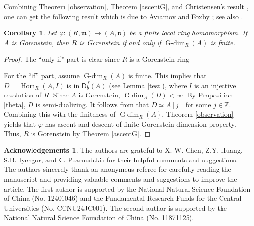 \documentclass{amsart}
\newcommand{\n}{\mathfrak{n}}
\newcommand{\D}{\mathsf{D}}
\newcommand{\0}{{\bf{0}}}
\newcommand{\m}{\mathfrak{m}}
\DeclareMathOperator{\Gdim}{G-dim}
\DeclareMathOperator{\Hom}{Hom}
\newtheorem{corollary}[theorem]{Corollary}
\theoremstyle{definition}
\newtheorem*{ack}{Acknowledgements}
\begin{document}
Combining Theorem \ref{observation}, Theorem \ref{ascentG}, and Christensen’s result \cite[Proposition 8.3]{Chr01}, one can get the following result which is due to Avramov and Foxby \cite[4.4.4 and 7.7.2]{AF}; see also \cite[Theorem 6.2]{ISW}.

\begin{corollary}\label{recover}
Let $\varphi\colon (R,\m)\rightarrow (A,\n)$ be a finite local ring homomorphism. If $A$ is Gorenstein, then
$R$ is Gorenstein if and only if $\Gdim_R(A)$ is finite.
\end{corollary}

\begin{proof}
The ``only if'' part is clear since $R$ is a Gorenstein ring.

For the ``if'' part, assume $\Gdim_R(A)$ is finite. This implies that $D=\Hom_R(A,I)$ is in $\D^f_b(A)$ (see Lemma \ref{test}), where $I$ is an injective resolution of $R$. Since $A$ is Gorenstein, $\Gdim_A(D)<\infty$.  By Proposition \ref{theta}, $D$ is semi-dualizing. 
It follows from \cite[Proposition 8.3]{Chr01} that $D\simeq A[j]$ for some $j\in \mathbb Z$.  Combining this with the finiteness of $\Gdim_R(A)$, Theorem \ref{observation} yields that $\varphi$ has ascent and descent of finite Gorenstein dimension property. Thus, $R$ is Gorenstein by Theorem \ref{ascentG}.
\end{proof}






\begin{ack}
The authors are grateful to X.-W. Chen, Z.Y. Huang, S.B. Iyengar, and C. Psaroudakis for their helpful comments and suggestions. The authors sincerely thank an anonymous referee for carefully reading the manuscript and providing valuable comments and suggestions to improve the article. 
The first author is supported by the National Natural Science Foundation of China (No. 12401046) and the Fundamental Research Funds for the Central Universities (No. CCNU24JC001).
The second author is supported by the National Natural Science Foundation of China (No. 11871125). 
\end{ack}



\end{document}
